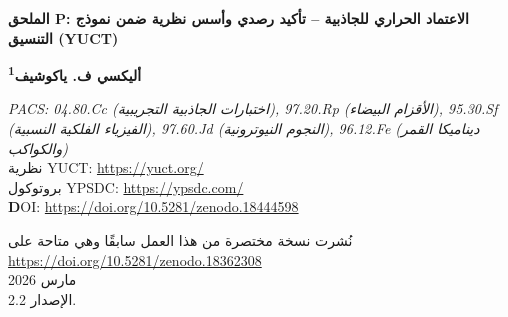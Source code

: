 \documentclass[11pt,a4paper]{article}
\newcommand{\Keff}{K_{\mathrm{eff}}}
\newcommand{\eps}{\varepsilon}
\newcommand{\kappac}{\kappa_c}
\begin{document}
	
	\begin{titlepage}
		\centering
		\vspace*{0cm}
		
		\Huge\textbf{الملحق P: الاعتماد الحراري للجاذبية – تأكيد رصدي وأسس نظرية ضمن نموذج التنسيق (YUCT)}
		
		\vspace{2.3cm}
		
		\Large\textbf{أليكسي ف. ياكوشيف\textsuperscript{1}}
		
		\vspace{0.2cm}
		
		\vspace{1.3cm}
		\large\textit{PACS: 04.80.Cc (اختبارات الجاذبية التجريبية), 97.20.Rp (الأقزام البيضاء), 95.30.Sf (الفيزياء الفلكية النسبية), 97.60.Jd (النجوم النيوترونية), 96.12.Fe (ديناميكا القمر والكواكب)} \\
		
		نظرية YUCT: \url{https://yuct.org/}\\
		بروتوكول YPSDC: \url{https://ypsdc.com/}\\
		
		\vspace{2cm}
		\textbf DOI: \url{https://doi.org/10.5281/zenodo.18444598}\\
		
		\vspace{1cm}
		
		\large 
		نُشرت نسخة مختصرة من هذا العمل سابقًا وهي متاحة على\\ \url{https://doi.org/10.5281/zenodo.18362308}\\
		\vspace{1cm}
		مارس 2026 \\ \large الإصدار 2.2.
		
		\newpage
		\begin{abstract}
			\noindent
			يُقدّم هذا العمل أساسًا رياضيًا صارمًا لفرضية اعتماد ثابت الجاذبية الفعال على درجة الحرارة، الناشئة عن نظرية التنسيق الموحدة لياكوشيف (YUCT). باستخدام قانون القياس الكسري للخطأ العام $\eps = \kappac \alpha \Keff^{-\beta}$ مع الأس المحدد تجريبيًا $\beta = 0.67 \pm 0.03$ والثابت العام $\kappac = 0.33$، يُظهر العمل أن تغير كفاءة التنسيق $\Keff$ عند تسخين المادة يؤدي إلى تعديل الحقل الجاذبي. يأتي التأكيد الرصدي الرئيسي من تحليل الانزياحات الحمراء الجذبوية لـ 26,041 قزمًا أبيض من بيانات SDSS DR1-19 (Crumpler et al., 2024)، والتي تظهر انزياحات حمراء أكبر بشكل منهجي للنجوم الساخنة عند نصف قطر ثابت بدلالة إحصائية $>6.1\sigma$. تأتي تأكيدات إضافية من بيانات القمر الصناعي GRACE (Rosat et al., 2025) التي سجلت شذوذًا جذبويًا سببه تحول الطور بيروفسكيت–ما بعد البيروفسكيت في دثار الأرض، وكذلك من تحليل المغناطيسات – نجوم نيوترونية ذات مجالات مغناطيسية فائقة القوة (Kaspi \& Beloborodov, 2017). تم اقتراح تجربة معملية ملموسة لقياس تغير الجاذبية بالقرب من مادة حديدية حُدِّدت حتى نقطة كوري؛ التأثير المتوقع هو $\delta g/g \sim 10^{-16}$–$10^{-18}$، وهو عند حد حساسية مقاييس التداخل الذري الحديثة. تشير النتائج التي تم الحصول عليها إلى أن ثابت الجاذبية ليس ثابتًا أساسيًا، بل هو مظهر من مظاهر ديناميكا التنسيق الحساسة للحالة الترموديناميكية للمادة.
		\end{abstract}
		

\end{titlepage}
\end{document}
